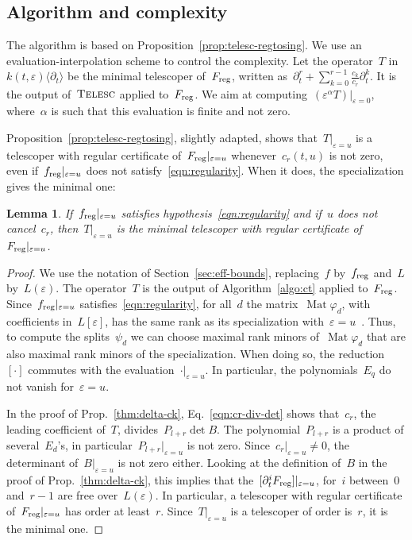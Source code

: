\documentclass{sig-alternate}
\newtheorem{lem}[thm]{Lemma}
\newcommand{\tCreatTel}{\textsc{Telesc}}
\newcommand{\CreatTel}{\mathop{\textsc{\tCreatTel}}}
\DeclareMathOperator{\Mat}{Mat}
\newcommand{\reg}{{\smash{\mathrm{reg}}}}
\begin{document}
\subsection{Algorithm and complexity}

\noindent The algorithm is based on Proposition~\ref{prop:telesc-regtosing}.
We use an evaluation-interpolation scheme to control the complexity.
Let the operator~$T$ in~$k(t,\varepsilon)\langle \partial_t \rangle$ be the minimal telescoper of~$F_\reg$, written as~$\partial_t^r + \sum_{k=0}^{r-1} \frac{c_k}{c_r}\partial_t^k$. It is the output of~$\CreatTel$ applied to~$F_\reg$. We aim at computing~$(\varepsilon^\alpha T)|_{\varepsilon=0}$, where~$\alpha$ is such that this evaluation is finite and not zero.

Proposition~\ref{prop:telesc-regtosing}, slightly adapted, shows that~$T|_{\varepsilon=u}$ is a telescoper with regular certificate of~$F_\reg|_{\varepsilon=u}$ whenever~$c_r(t,u)$ is not zero, even if~$f_\reg|_{\varepsilon=u}$ does not satisfy~\eqref{eqn:regularity}.
When it does, the specialization gives the minimal one:
\begin{lem}\label{lem:telesc-spe}
If~$f_\reg|_{\varepsilon=u}$ satisfies hypothesis~\eqref{eqn:regularity}
and if~$u$ does not cancel~$c_r$,
then~$T|_{\varepsilon=u}$ is the minimal telescoper with regular certificate of~$F_\reg|_{\varepsilon=u}$.
\end{lem}

\begin{proof}
  We use  the notation of Section~\ref{sec:eff-bounds}, replacing~$f$ by~$f_\reg$ and~$L$ by~$L(\varepsilon)$.
  The operator~$T$ is the output of Algorithm~\ref{algo:ct} applied to~$F_\reg$.
  Since~$f_\reg|_{\varepsilon=u}$ satisfies~\eqref{eqn:regularity}, for all~$d$ the matrix~$\Mat\varphi_d$, with coefficients in~$L[\varepsilon]$, has the same rank as its specialization with~$\varepsilon=u$~\cite[\S 58]{Mac16}.
  Thus, to compute the splits~$\psi_d$ we can choose maximal rank minors of~$\Mat\varphi_d$ that are also maximal rank minors of the specialization.
  When doing so, the reduction~$[\cdot]$ commutes with the evaluation~$\cdot|_{\varepsilon=u}$.
  In particular, the polynomials~$E_q$ do not vanish for~$\varepsilon=u$.

In the proof of Prop.~\ref{thm:delta-ck}, Eq.~\eqref{eqn:cr-div-det} shows that~$c_r$, the leading coefficient of~$T$, divides~$P_{l+r} \det B$. The polynomial~$P_{l+r}$ is a product of several~$E_d$'s, in particular~$P_{l+r}|_{\varepsilon=u}$ is not zero.
  Since~$c_r|_{\varepsilon=u} \neq 0$, the determinant of~$B|_{\varepsilon=u}$ is not zero either.
  Looking at the definition of~$B$ in the proof of Prop.~\ref{thm:delta-ck}, this implies that the~$[\partial^i_t F_\reg]|_{\varepsilon=u}$, for~$i$ between~$0$ and~$r-1$ are free over~$L(\varepsilon)$.
In particular, a telescoper with regular certificate of~$F_\reg|_{\varepsilon=u}$ has order at least~$r$.
  Since~$T|_{\varepsilon=u}$ is a telescoper of order is~$r$, it is the minimal one.
\end{proof}
\end{document}
